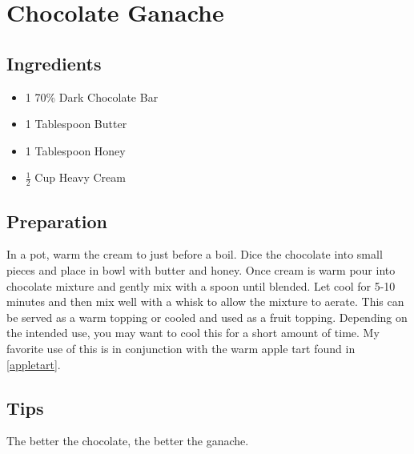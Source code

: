 \thispagestyle{fancy}
\section{Chocolate Ganache} \label{ganache}
\AddToShipoutPicture*{\Strawberries}

\subsection*{Ingredients}
\begin{multicols}{3}
	\begin{itemize}
		\item 1 70\% Dark Chocolate Bar
		\item 1 Tablespoon Butter
		\item 1 Tablespoon Honey
		\item $\frac{1}{2}$ Cup Heavy Cream
	\end{itemize}
\end{multicols}

\subsection*{Preparation}

In a pot, warm the cream to just before a boil. Dice the chocolate into small pieces and place in bowl with butter and honey. Once cream is warm pour into chocolate mixture and gently mix with a spoon until blended. Let cool for 5-10 minutes and then mix well with a whisk to allow the mixture to aerate. This can be served as a warm topping or cooled and used as a fruit topping. Depending on the intended use, you may want to cool this for a short amount of time. My favorite use of this is in conjunction with the warm apple tart found in \ref{appletart}.

\subsection*{Tips}

The better the chocolate, the better the ganache.
